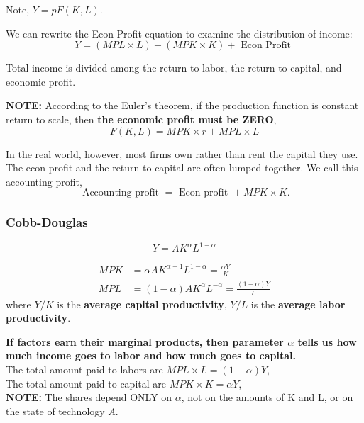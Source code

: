 \documentclass[12pt]{article}
\begin{document}
Note, $ Y = p F(K,L) $.

We can rewrite the Econ Profit equation to examine the distribution of income:
\begin{equation*}
Y = (MPL  \times L) + (MPK  \times K) + \text{ Econ Profit }
\end{equation*}

Total income is divided among the return to labor, the return to capital, and economic 
profit.

{\textbf {NOTE:}} According to the Euler's theorem, if the production function is
constant return to scale, then {\textbf {the economic profit must be ZERO}},
\begin{equation*}
F(K,L) = MPK  \times r + MPL  \times L
\end{equation*}


In the real world, however, most firms own rather than rent the capital they use. The
econ profit and the return to capital are often lumped together. We call this 
accounting profit,
\begin{equation*}
\text{ Accounting profit } = \text{ Econ profit } + MPK  \times K.
\end{equation*}

\subsubsection{Cobb-Douglas}

\begin{equation*}
Y = AK^{\alpha}L^{1 - \alpha}
\end{equation*}

\begin{align*}
MPK &= \alpha AK^{\alpha - 1}L^{1 - \alpha} = \frac{\alpha Y}{K}\\
MPL &= (1 - \alpha)AK^{\alpha}L^{ - \alpha} = \frac{(1 - \alpha)Y}{L}
\end{align*}
where $ Y/K $ is the {\textbf {average capital productivity}}, $ Y/L $ is the 
{\textbf {average labor productivity}}.


{\textbf {If factors earn their marginal products, then parameter $ \alpha $ tells us
how much income goes to labor and how much goes to capital.}}\\
The total amount paid to labors are $ MPL  \times L = (1 - \alpha)Y $,\\
The total amount paid to capital are $ MPK  \times K = \alpha Y $,\\
{\textbf {NOTE:}} The shares depend ONLY on $ \alpha $, not on the amounts of K and L, or
on the state of technology $ A $.
\end{document}
